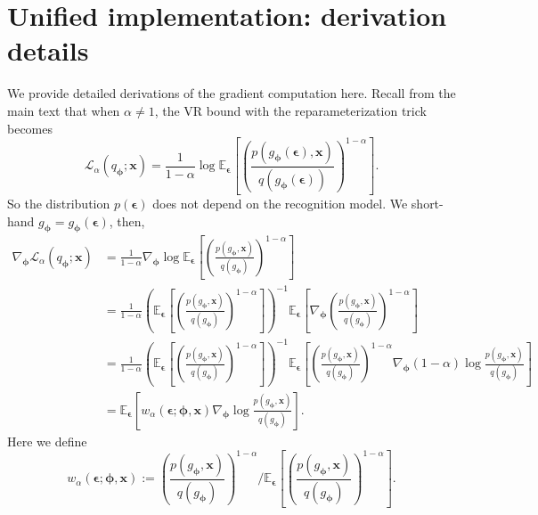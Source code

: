 \section{Unified implementation: derivation details}
\label{sec:implementation}

We provide detailed derivations of the gradient computation here. Recall from the main text that when $\alpha \neq 1$, the VR bound with the reparameterization trick becomes
\begin{equation}
\mathcal{L}_{\alpha}(q_{\bm{\phi}}; \bm{x}) = \frac{1}{1 - \alpha} \log \mathbb{E}_{\bm{\epsilon}} \left[\left( \frac{p(g_{\bm{\phi}}(\bm{\epsilon}), \bm{x})}{q(g_{\bm{\phi}}(\bm{\epsilon}))} \right)^{1 - \alpha} \right].
\end{equation}
So the distribution $p(\bm{\epsilon})$ does not depend on the recognition model. We short-hand $g_{\bm{\phi}} = g_{\bm{\phi}}(\bm{\epsilon})$, then, 
\begin{equation*}
\begin{aligned}
\nabla_{\bm{\phi}} \mathcal{L}_{\alpha}(q_{\bm{\phi}}; \bm{x}) 
&= \frac{1}{1 - \alpha} \nabla_{\bm{\phi}} \log \mathbb{E}_{\bm{\epsilon}} \left[ \left( \frac{p(g_{\bm{\phi}}, \bm{x})}{q(g_{\bm{\phi}})} \right)^{1 - \alpha} \right] \\
&= \frac{1}{1 - \alpha} \left( \mathbb{E}_{\bm{\epsilon}} \left[ \left( \frac{p(g_{\bm{\phi}}, \bm{x})}{q(g_{\bm{\phi}})} \right)^{1 - \alpha} \right] \right)^{-1} \mathbb{E}_{\bm{\epsilon}} \left[ \nabla_{\bm{\phi}} \left( \frac{p(g_{\bm{\phi}}, \bm{x})}{q(g_{\bm{\phi}})} \right)^{1 - \alpha} \right] \\
&= \frac{1}{1 - \alpha} \left( \mathbb{E}_{\bm{\epsilon}} \left[ \left( \frac{p(g_{\bm{\phi}}, \bm{x})}{q(g_{\bm{\phi}})} \right)^{1 - \alpha} \right] \right)^{-1} \mathbb{E}_{\bm{\epsilon}} \left[ \left( \frac{p(g_{\bm{\phi}}, \bm{x})}{q(g_{\bm{\phi}})} \right)^{1 - \alpha} \nabla_{\bm{\phi}} (1 - \alpha) \log \frac{p(g_{\bm{\phi}}, \bm{x})}{q(g_{\bm{\phi}})} \right] \\
&= \mathbb{E}_{\bm{\epsilon}} \left[ w_{\alpha}(\bm{\epsilon}; \bm{\phi}, \bm{x}) \nabla_{\bm{\phi}} \log \frac{p(g_{\bm{\phi}}, \bm{x})}{q(g_{\bm{\phi}})} \right].
\end{aligned}
\end{equation*}
Here we define
\begin{equation}
w_{\alpha}(\bm{\epsilon}; \bm{\phi}, \bm{x}) := \left( \frac{p(g_{\bm{\phi}}, \bm{x})}{q(g_{\bm{\phi}})} \right)^{1 - \alpha} \bigg/ \mathbb{E}_{\bm{\epsilon}} \left[ \left( \frac{p(g_{\bm{\phi}}, \bm{x})}{q(g_{\bm{\phi}})} \right)^{1 - \alpha} \right].
\end{equation}
